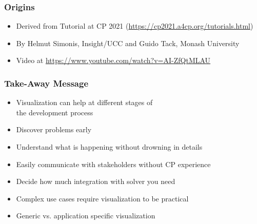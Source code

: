 

\begin{frame}
\frametitle{Origins}
\begin{itemize}
\item Derived from Tutorial at CP 2021 (\url{https://cp2021.a4cp.org/tutorials.html})
\item By Helmut Simonis, Insight/UCC and Guido Tack, Monash University
\item Video at \url{https://www.youtube.com/watch?v=AI-ZfQtMLAU}
\end{itemize}
\end{frame}


\begin{frame}
\frametitle{Take-Away Message}
\begin{itemize}
\item Visualization can help at different stages of \\the development process
\item Discover problems early
\item Understand what is happening without drowning in details
\item Easily communicate with stakeholders without CP experience 
\item Decide how much integration with solver you need
\item Complex use cases require visualization to be practical
\item Generic vs. application specific visualization 
\end{itemize}
\end{frame}

